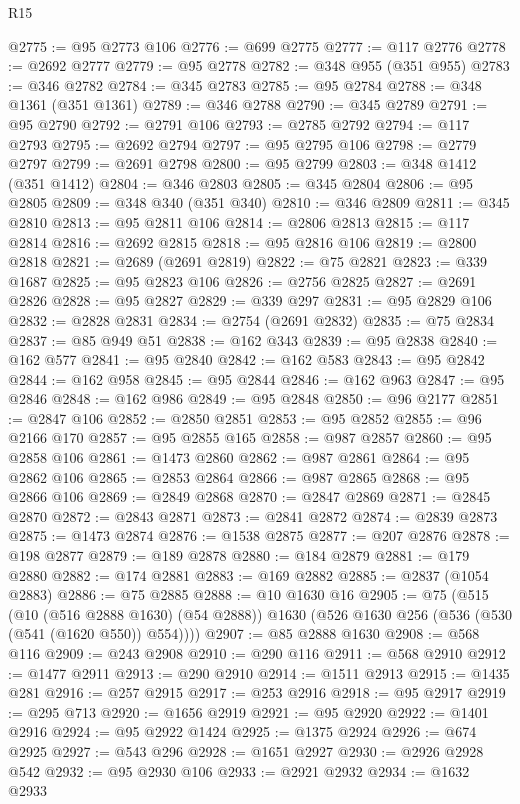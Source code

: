 \begin{lexlean}{R15}
\begin{coremodule}
@2775 := @95 @2773 @106
@2776 := @699 @2775
@2777 := @117 @2776
@2778 := @2692 @2777
@2779 := @95 @2778
@2782 := @348 @955 (@351 @955)
@2783 := @346 @2782
@2784 := @345 @2783
@2785 := @95 @2784
@2788 := @348 @1361 (@351 @1361)
@2789 := @346 @2788
@2790 := @345 @2789
@2791 := @95 @2790
@2792 := @2791 @106
@2793 := @2785 @2792
@2794 := @117 @2793
@2795 := @2692 @2794
@2797 := @95 @2795 @106
@2798 := @2779 @2797
@2799 := @2691 @2798
@2800 := @95 @2799
@2803 := @348 @1412 (@351 @1412)
@2804 := @346 @2803
@2805 := @345 @2804
@2806 := @95 @2805
@2809 := @348 @340 (@351 @340)
@2810 := @346 @2809
@2811 := @345 @2810
@2813 := @95 @2811 @106
@2814 := @2806 @2813
@2815 := @117 @2814
@2816 := @2692 @2815
@2818 := @95 @2816 @106
@2819 := @2800 @2818
@2821 := @2689 (@2691 @2819)
@2822 := @75 @2821
@2823 := @339 @1687
@2825 := @95 @2823 @106
@2826 := @2756 @2825
@2827 := @2691 @2826
@2828 := @95 @2827
@2829 := @339 @297
@2831 := @95 @2829 @106
@2832 := @2828 @2831
@2834 := @2754 (@2691 @2832)
@2835 := @75 @2834
@2837 := @85 @949 @51
@2838 := @162 @343
@2839 := @95 @2838
@2840 := @162 @577
@2841 := @95 @2840
@2842 := @162 @583
@2843 := @95 @2842
@2844 := @162 @958
@2845 := @95 @2844
@2846 := @162 @963
@2847 := @95 @2846
@2848 := @162 @986
@2849 := @95 @2848
@2850 := @96 @2177
@2851 := @2847 @106
@2852 := @2850 @2851
@2853 := @95 @2852
@2855 := @96 @2166 @170
@2857 := @95 @2855 @165
@2858 := @987 @2857
@2860 := @95 @2858 @106
@2861 := @1473 @2860
@2862 := @987 @2861
@2864 := @95 @2862 @106
@2865 := @2853 @2864
@2866 := @987 @2865
@2868 := @95 @2866 @106
@2869 := @2849 @2868
@2870 := @2847 @2869
@2871 := @2845 @2870
@2872 := @2843 @2871
@2873 := @2841 @2872
@2874 := @2839 @2873
@2875 := @1473 @2874
@2876 := @1538 @2875
@2877 := @207 @2876
@2878 := @198 @2877
@2879 := @189 @2878
@2880 := @184 @2879
@2881 := @179 @2880
@2882 := @174 @2881
@2883 := @169 @2882
@2885 := @2837 (@1054 @2883)
@2886 := @75 @2885
@2888 := @10 @1630 @16
@2905 := @75
    (@515
      (@10 (@516 @2888 @1630) (@54 @2888))
      @1630
      (@526 @1630 @256 (@536 (@530 (@541 (@1620 @550)) @554))))
@2907 := @85 @2888 @1630
@2908 := @568 @116
@2909 := @243 @2908
@2910 := @290 @116
@2911 := @568 @2910
@2912 := @1477 @2911
@2913 := @290 @2910
@2914 := @1511 @2913
@2915 := @1435 @281
@2916 := @257 @2915
@2917 := @253 @2916
@2918 := @95 @2917
@2919 := @295 @713
@2920 := @1656 @2919
@2921 := @95 @2920
@2922 := @1401 @2916
@2924 := @95 @2922 @1424
@2925 := @1375 @2924
@2926 := @674 @2925
@2927 := @543 @296
@2928 := @1651 @2927
@2930 := @2926 @2928 @542
@2932 := @95 @2930 @106
@2933 := @2921 @2932
@2934 := @1632 @2933

\end{coremodule}
\end{lexlean}
